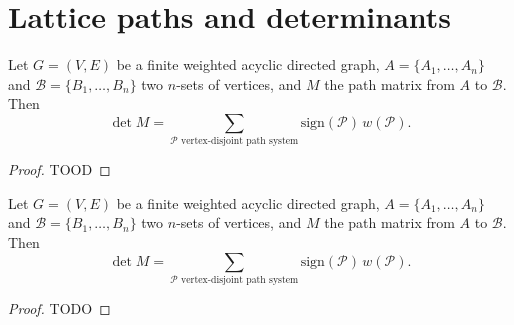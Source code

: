 \chapter{Lattice paths and determinants}

\begin{lemma}
  \label{ch32lemma}
  Let $G = (V, E)$ be a finite weighted acyclic directed graph, $A = \{A_1, \dots, A_n\}$ and $\mathcal{B} = \{B_1, \dots, B_n\}$ two $n$-sets of vertices, and $M$ the path matrix from $A$ to $\mathcal{B}$. Then
  \[
  \det M = \sum_{\mathcal{P} \text{ vertex-disjoint path system}} \text{sign}(\mathcal{P}) \, w(\mathcal{P}). \tag{3}
  \]
\end{lemma}
\begin{proof}
  TOOD
\end{proof}

\begin{theorem}
  \label{ch32theorem}
  Let $G = (V, E)$ be a finite weighted acyclic directed graph,
  $A = \{A_1, \dots, A_n\}$ and $\mathcal{B} = \{B_1, \dots, B_n\}$
  two $n$-sets of vertices, and $M$ the path matrix from $A$ to $\mathcal{B}$. Then
  \[
  \det M = \sum_{\mathcal{P} \text{ vertex-disjoint path system}} \text{sign}(\mathcal{P}) \, w(\mathcal{P}). \tag{3}
  \]
\end{theorem}
\begin{proof}
  TODO
\end{proof}
